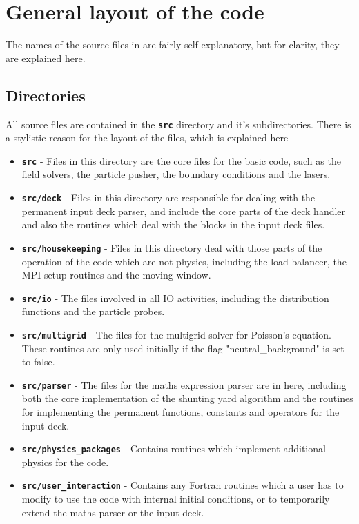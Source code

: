 \documentclass[12pt,a4paper]{article}
\newcommand{\inlinecode}[1]{{\color{warwickred} \bf\texttt{#1}}}
\newcommand{\EPOCH}{{\color{warwickdark}\fontfamily{phv}\selectfont{EPOCH}}}
\begin{document}
\section{General layout of the {\EPOCH} code}

The names of the source files in {\EPOCH} are fairly self explanatory, but for
clarity, they are explained here.

\subsection{Directories}
All source files are contained in the \inlinecode{src} directory and it's
subdirectories. There is a stylistic reason for the layout of the files, which
is explained here

\begin{itemize}
\item \inlinecode{src} - Files in this directory are the core files for the
  basic {\EPOCH} code, such as the field solvers, the particle pusher, the
  boundary conditions and the lasers.
\item \inlinecode{src/deck} - Files in this directory are responsible for
  dealing with the permanent input deck parser, and include the core parts of
  the deck handler and also the routines which deal with the blocks in the
  input deck files.
\item \inlinecode{src/housekeeping} - Files in this directory deal with those
  parts of the operation of the code which are not physics, including the load
  balancer, the MPI setup routines and the moving window.
\item \inlinecode{src/io} - The files involved in all IO activities, including
  the distribution functions and the particle probes.
\item \inlinecode{src/multigrid} - The files for the multigrid solver for
  Poisson's equation. These routines are only used initially if the flag
  "neutral\_background" is set to false.
\item \inlinecode{src/parser} - The files for the maths expression parser are
  in here, including both the core implementation of the shunting yard
  algorithm and the routines for implementing the permanent functions,
  constants and operators for the input deck.
\item \inlinecode{src/physics\_packages} - Contains routines which implement
  additional physics for the code.
\item \inlinecode{src/user\_interaction} - Contains any Fortran routines which
  a user has to modify to use the code with internal initial conditions, or to
  temporarily extend the maths parser or the input deck.
\end{itemize}
\end{document}
